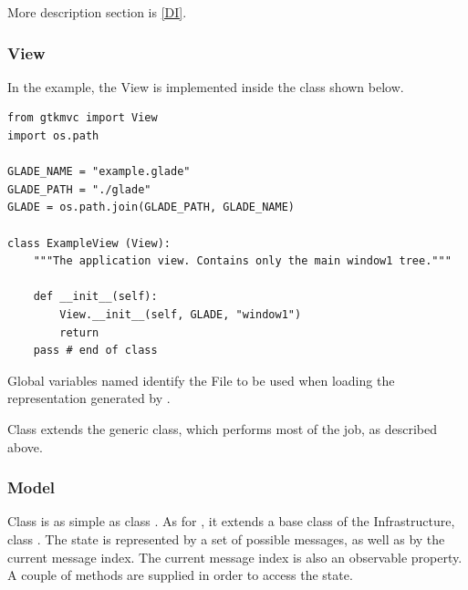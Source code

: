 More description section is \ref{DI}.


\subsubsection{View}
In the example, the View is implemented inside the class
 shown below.

{ \codesize 
\begin{verbatim}  
from gtkmvc import View
import os.path

GLADE_NAME = "example.glade"
GLADE_PATH = "./glade" 
GLADE = os.path.join(GLADE_PATH, GLADE_NAME)

class ExampleView (View):
    """The application view. Contains only the main window1 tree."""

    def __init__(self):
        View.__init__(self, GLADE, "window1")
        return
    pass # end of class
\end{verbatim}}

Global variables named  identify the \glade File to
be used when loading the \gui representation generated by \glade.

Class  extends the generic 
class, which performs most of the job, as described above.


\subsubsection{Model}
Class  is as simple as class
.  As for , it extends a
base class of the \mvco Infrastructure, class .  The
state is represented by a set of possible messages, as well as by the
current message index. The current message index is also an
observable property. A couple of methods are supplied in order to
access the state.

